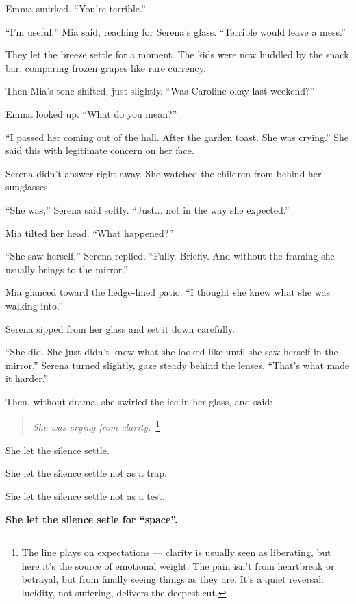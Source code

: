 Emma smirked. ``You’re terrible.''

``I’m useful,'' Mia said, reaching for Serena’s glass. ``Terrible would leave a mess.''

They let the breeze settle for a moment. The kids were now huddled by the snack bar, comparing frozen grapes 
like rare currency.

Then Mia’s tone shifted, just slightly. ``Was Caroline okay last weekend?''

Emma looked up. ``What do you mean?''

``I passed her coming out of the hall. After the garden toast. She was crying.'' She said this with legitimate 
concern on her face.

Serena didn’t answer right away. She watched the children from behind her sunglasses.

``She was,'' Serena said softly. ``Just... not in the way she expected.''

Mia tilted her head. ``What happened?''

``She saw herself,'' Serena replied. ``Fully. Briefly. And without the framing she usually brings to 
the mirror.''

Mia glanced toward the hedge-lined patio. ``I thought she knew what she was walking into.''

Serena sipped from her glass and set it down carefully.

``She did. She just didn’t know what she looked like until she saw herself in the mirror.'' Serena turned slightly, 
gaze steady behind the lenses. ``That’s what made it harder.''

Then, without drama, she swirled the ice in her glass, and said:

\begin{quote}
\centering
\textit{She was crying from clarity.}\ 
\footnote{The line plays on
expectations — clarity is usually seen as liberating, but here it’s the source of emotional weight. The pain
isn't from heartbreak or betrayal, but from finally seeing things as they are. It's a quiet reversal: lucidity,
not suffering, delivers the deepest cut.}
\end{quote}

She let the silence settle. 

She let the silence settle not as a trap.  

She let the silence settle not as a test. 

\textbf{She let the silence setle for ``space''.} 

